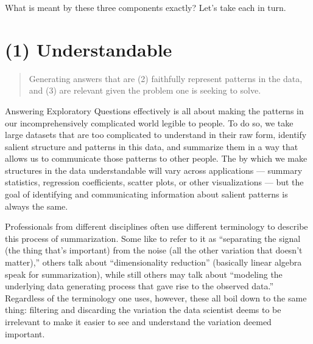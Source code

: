 \documentclass[letterpaper,10pt,english]{jupyterBook}
\begin{document}
\sphinxAtStartPar
What is meant by these three components exactly? Let’s take each in turn.















\sphinxstepscope


\section{(1) Understandable}
\label{\detokenize{30_questions/17_exploratory_internal_understandable:understandable}}\label{\detokenize{30_questions/17_exploratory_internal_understandable::doc}}\begin{quote}

\sphinxAtStartPar
Generating answers that are  (2) faithfully represent patterns in the data, and (3) are relevant given the problem one is seeking to solve.
\end{quote}

\sphinxAtStartPar
Answering Exploratory Questions effectively is all about making the patterns in our incomprehensively complicated world legible to people. To do so, we take large datasets that are too complicated to understand in their raw form, identify salient structure and patterns in this data, and summarize them in a way that allows us to communicate those patterns to other people. The  by which we make structures in the data understandable will vary across applications — summary statistics, regression coefficients, scatter plots, or other visualizations — but the goal of identifying and communicating information about salient patterns is always the same.

\sphinxAtStartPar
Professionals from different disciplines often use different terminology to describe this process of summarization. Some like to refer to it as “separating the signal (the thing that’s important) from the noise (all the other variation that doesn’t matter),” others talk about “dimensionality reduction” (basically linear algebra speak for summarization), while still others may talk about “modeling the underlying data generating process that gave rise to the observed data.” Regardless of the terminology one uses, however, these all boil down to the same thing: filtering and discarding the variation the data scientist deems to be irrelevant to make it easier to see and understand the variation deemed important.
\end{document}
